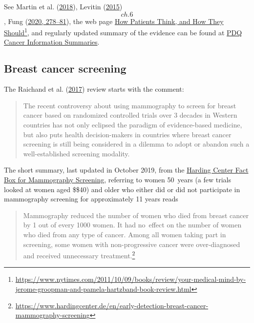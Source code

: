\documentclass[
  10pt,
  b5paper]{book}
\begin{document}
See Martin et al. (\protect\hyperlink{ref-martin2018effect}{2018}), Levitin (\protect\hyperlink{ref-levitin_2015}{2015}) \[ch. 6\], Fung (\protect\hyperlink{ref-fung2020cancer}{2020, 278--81}), the web page \href{https://www.nytimes.com/2011/10/09/books/review/your-medical-mind-by-jerome-groopman-and-pamela-hartzband-book-review.html}{How Patients Think, and How They
Should}\footnote{\url{https://www.nytimes.com/2011/10/09/books/review/your-medical-mind-by-jerome-groopman-and-pamela-hartzband-book-review.html}},
and regularly updated summary of the evidence can be found at \href{https://www.ncbi.nlm.nih.gov/books/NBK65906/}{PDQ
Cancer Information
Summaries}.

\hypertarget{breast-cancer-screening}{%
\subsection*{Breast cancer screening}\label{breast-cancer-screening}}

The Raichand et al. (\protect\hyperlink{ref-raichand2017conclusions}{2017}) review starts with the comment:

\begin{quote}
The recent controversy about using mammography to screen for breast
cancer based on randomized controlled trials over 3 decades in Western
countries has not only eclipsed the paradigm of evidence-based
medicine, but also puts health decision-makers in countries where
breast cancer screening is still being considered in a dilemma to
adopt or abandon such a well-established screening modality.
\end{quote}

The short summary, last updated in October 2019, from the \href{https://www.hardingcenter.de/en/early-detection-breast-cancer-mammography-screening}{Harding
Center Fact Box for Mammography
Screening},
referring to women 50~years (a few trials looked at women aged
\$\geq\$40) and older who either did or did not participate in
mammography screening for approximately 11 years reads

\begin{quote}
Mammography reduced the number of women who died from breast cancer by
1 out of every 1000 women. It had no~effect on the number of women who
died from any type of cancer. Among all women taking part in
screening, some women with non-progressive cancer were over-diagnosed
and received unnecessary treatment.\footnote{\url{https://www.hardingcenter.de/en/early-detection-breast-cancer-mammography-screening}}
\end{quote}
\end{document}
